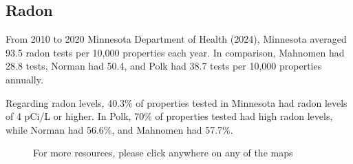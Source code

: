 \documentclass[
  a4paper,
  landscape]{scrreprt}
\begin{document}
\subsection{Radon}\label{radon}

From 2010 to 2020 Minnesota Department of Health (2024), Minnesota
averaged 93.5 radon tests per 10,000 properties each year. In
comparison, Mahnomen had 28.8 tests, Norman had 50.4, and Polk had 38.7
tests per 10,000 properties annually.

Regarding radon levels, 40.3\% of properties tested in Minnesota had
radon levels of 4 pCi/L or higher. In Polk, 70\% of properties tested
had high radon levels, while Norman had 56.6\%, and Mahnomen had 57.7\%.

\begin{figure}[H]


\caption{\label{fig-radon}For more resources, please click anywhere on
any of the maps}

\end{figure}%
\end{document}

